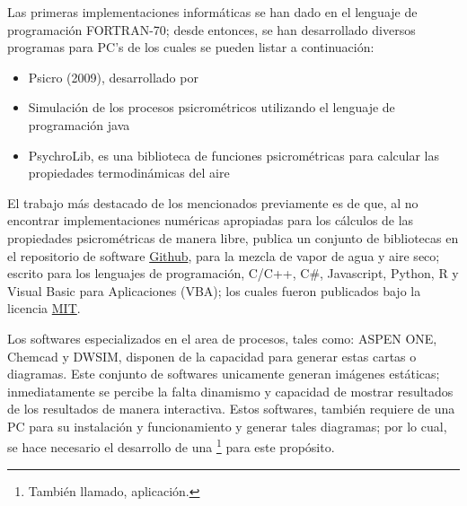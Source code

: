 Las primeras implementaciones informáticas se han dado en el lenguaje de programación FORTRAN-70; desde entonces, se han desarrollado diversos programas para PC's de los cuales se pueden listar a continuación:
\begin{itemize}
    \item Psicro (2009),  desarrollado por \parencite{Compagnon2010}
    \item Simulación de los procesos psicrométricos utilizando el lenguaje de programación java \parencite{Cardoso2016}
    \item PsychroLib, es una biblioteca de funciones psicrométricas para calcular las propiedades termodinámicas del aire \parencite{Meyer2019}
\end{itemize}

El trabajo más destacado de los mencionados previamente es de \textcite[]{Meyer2019} que, al no encontrar implementaciones numéricas apropiadas para los cálculos de las propiedades psicrométricas de manera libre, publica un conjunto de bibliotecas en el repositorio de software \href{https://github.com/psychrometrics/psychrolib}{Github}, para la mezcla de vapor de agua y aire seco; escrito para los lenguajes de programación, C/C++, C\#, Javascript, Python, R y Visual Basic para Aplicaciones (VBA); los cuales fueron publicados bajo la licencia \href{https://github.com/psychrometrics/psychrolib/blob/master/LICENSE.txt}{MIT}. %

Los softwares especializados en el area de procesos, tales como: ASPEN ONE, Chemcad y DWSIM, disponen de la capacidad para generar estas cartas o diagramas. Este conjunto de softwares unicamente generan imágenes estáticas; inmediatamente se percibe la falta dinamismo y capacidad de mostrar resultados de los resultados de manera interactiva. Estos softwares, también requiere de una PC para su instalación y funcionamiento y generar tales diagramas; por lo cual, se hace necesario el desarrollo de una \footnote{También llamado, aplicación.}  para este propósito. %






